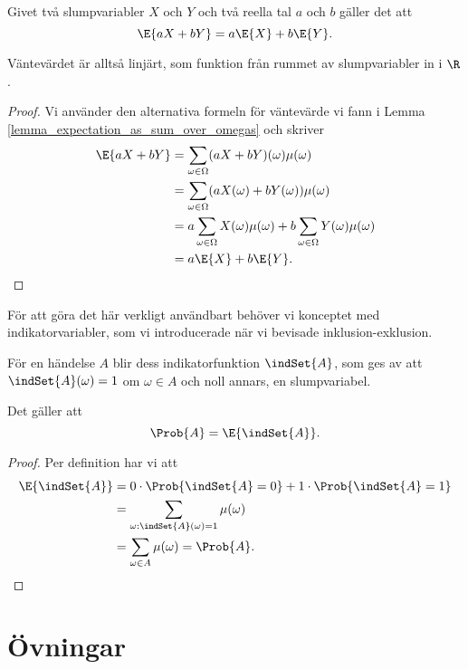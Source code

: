 \documentclass[nobib]{tufte-handout}
\begin{document}
\begin{lemma}
    Givet två slumpvariabler $X$ och $Y$ och två reella tal $a$ och $b$ gäller det att
    $$\E{aX + bY} = a\E{X} + b\E{Y}.$$

    Väntevärdet är alltså linjärt, som funktion från rummet av slumpvariabler in i $\R$.

    \begin{proof}
        Vi använder den alternativa formeln för väntevärde vi fann i Lemma \ref{lemma_expectation_as_sum_over_omegas} och skriver
        \begin{align*}
            \E{aX + bY} &= \sum_{\omega \in \Omega} (aX + bY)(\omega)\mu(\omega)\\
            &= \sum_{\omega \in \Omega} (aX(\omega) + bY(\omega))\mu(\omega)\\
            &= a\sum_{\omega \in \Omega} X(\omega)\mu(\omega) + b\sum_{\omega \in \Omega} Y(\omega)\mu(\omega)\\
            &= a\E{X} + b\E{Y}.
        \end{align*}
    \end{proof}
\end{lemma}

För att göra det här verkligt användbart behöver vi konceptet med indikatorvariabler, som vi introducerade när vi bevisade inklusion-exklusion.

\begin{proposition}
    För en händelse $A$ blir dess indikatorfunktion $\indSet{A}$, som ges av att $\indSet{A}(\omega) = 1$ om $\omega \in A$ och noll annars, en slumpvariabel.

    Det gäller att
    $$\Prob{A} = \E{\indSet{A}}.$$

    \begin{proof}
        Per definition har vi att
        \begin{align*}
            \E{\indSet{A}} &= 0\cdot\Prob{\indSet{A} = 0} + 1\cdot\Prob{\indSet{A} = 1}\\
            &= \sum_{\omega: \indSet{A}(\omega) = 1} \mu(\omega)\\
            &= \sum_{\omega \in A} \mu(\omega) = \Prob{A}.
        \end{align*}
    \end{proof}
\end{proposition}

\section{Övningar}


%
%
\end{document}
